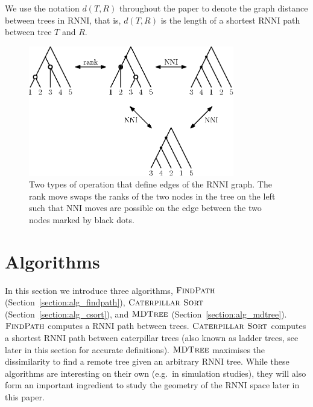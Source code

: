 \documentclass{amsart}
\newcommand{\nni}{\mathrm{NNI}}
\newcommand{\rnni}{\mathrm{RNNI}}
\newcommand{\csort}{\textsc{Caterpillar Sort}}
\newcommand{\findpath}{\textsc{FindPath}}
\newcommand{\mdtree}{\textsc{MDTree}}
\begin{document}
We use the notation $d(T, R)$ throughout the paper to denote the graph distance between trees in $\rnni$, that is, $d(T, R)$ is the length of a shortest $\rnni$ path between tree $T$ and $R$.

\begin{figure}[H]
\centering
\includegraphics[width=0.8\textwidth]{RNNI}
\vspace{12pt}
\caption{Two types of operation that define edges of the $\rnni$ graph.
The rank move swaps the ranks of the two nodes in the tree on the left such that $\nni$ moves are possible on the edge between the two nodes marked by black dots.}
\label{fig:RNNI}
\end{figure}



\section{Algorithms}
\label{section:algorithms}

In this section we introduce three algorithms, $\findpath$ (Section~\ref{section:alg_findpath}), $\csort$ (Section~\ref{section:alg_csort}), and $\mdtree$ (Section~\ref{section:alg_mdtree}).
$\findpath$ computes a $\rnni$ path between trees.
$\csort$ computes a shortest $\rnni$ path between caterpillar trees (also known as ladder trees, see later in this section for accurate definitions).
$\mdtree$ maximises the dissimilarity to find a remote tree given an arbitrary $\rnni$ tree.
While these algorithms are interesting on their own (e.g.\ in simulation studies), they will also form an important ingredient to study the geometry of the $\rnni$ space later in this paper.
\end{document}
